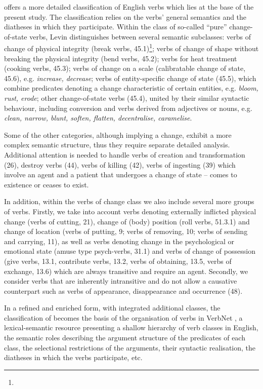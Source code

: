 \documentclass[output=paper,colorlinks,citecolor=brown]{langscibook}
\begin{document}
\citet{Levin1993} offers a more detailed classification of English verbs which lies at the base of the present study. The classification relies on the verbs' general semantics and the diatheses in which they participate. Within the class of so-called “pure” change-of-state verbs, Levin distinguishes between several semantic subclasses: verbs of change of physical integrity (break verbs, 45.1)\footnote{};  verbs of change of shape  without breaking the physical integrity (bend verbs, 45.2); verbs for heat treatment (cooking verbs, 45.3); verbs of change on a scale (calibratable change of state, 45.6), e.g. \textit{increase, decrease}; verbs of entity-specific change of state (45.5), which combine predicates denoting a change characteristic of certain entities, e.g. \textit{bloom, rust, erode}; other change-of-state verbs (45.4), united by their similar syntactic behaviour, including conversion and verbs derived from adjectives or nouns, e.g. \textit{clean, narrow, blunt, soften, flatten, decentralise, caramelise}.

Some of the other categories, although implying a change, exhibit a more complex semantic structure, thus they require separate detailed analysis. Additional attention is needed to handle verbs of creation and transformation (26), destroy verbs (44), verbs of killing (42), verbs of ingesting (39) which involve an agent and a patient that undergoes a change of state -- comes to existence or ceases to exist.

In addition, within the verbs of change class we also include several more groups of verbs. Firstly, we take into account verbs denoting externally inflicted physical change (verbs of cutting, 21), change of (body) position (roll verbs, 51.3.1) and change of location (verbs of putting, 9; verbs of removing, 10; verbs of sending and carrying, 11), as well as verbs denoting change in the psychological or emotional state (amuse type psych-verbs, 31.1) and verbs of change of possession (give verbs, 13.1, contribute verbs, 13.2, verbs of obtaining, 13.5, verbs of exchange, 13.6) which are always transitive and require an agent. Secondly, we consider verbs that are inherently intransitive and do not allow a causative counterpart such as verbs of appearance, disappearance and occurrence (48).

In a refined and enriched form, with integrated additional classes, the classification of \citet{Levin1993} becomes the basis of the organisation of verbs in VerbNet \citep{Kipper-Schuler2005}, a lexical-semantic resource presenting a shallow hierarchy of verb classes in English, the semantic roles describing the argument structure of the predicates of each class, the selectional restrictions of the arguments, their syntactic realisation, the diatheses in which the verbs participate, etc.
\end{document}
